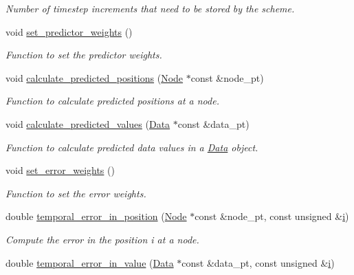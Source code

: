 \begin{DoxyCompactItemize}
\begin{DoxyCompactList}\small\item\em Number of timestep increments that need to be stored by the scheme. \end{DoxyCompactList}\item 
void \hyperlink{classoomph_1_1BDF_a9c5b309e589b0e0da14d912556e5cc4a}{set\+\_\+predictor\+\_\+weights} ()
\begin{DoxyCompactList}\small\item\em Function to set the predictor weights. \end{DoxyCompactList}\item 
void \hyperlink{classoomph_1_1BDF_a24a8bcf4fffc8cd4514ef36fc2c997f8}{calculate\+\_\+predicted\+\_\+positions} (\hyperlink{classoomph_1_1Node}{Node} $\ast$const \&node\+\_\+pt)
\begin{DoxyCompactList}\small\item\em Function to calculate predicted positions at a node. \end{DoxyCompactList}\item 
void \hyperlink{classoomph_1_1BDF_a4c3da151a405c2041103cb2795c3ff95}{calculate\+\_\+predicted\+\_\+values} (\hyperlink{classoomph_1_1Data}{Data} $\ast$const \&data\+\_\+pt)
\begin{DoxyCompactList}\small\item\em Function to calculate predicted data values in a \hyperlink{classoomph_1_1Data}{Data} object. \end{DoxyCompactList}\item 
void \hyperlink{classoomph_1_1BDF_ae7edaffc90cfe8cca6817751fa3cccb8}{set\+\_\+error\+\_\+weights} ()
\begin{DoxyCompactList}\small\item\em Function to set the error weights. \end{DoxyCompactList}\item 
double \hyperlink{classoomph_1_1BDF_ae4ef2e161fb944b7e6fcf6f7ee47579b}{temporal\+\_\+error\+\_\+in\+\_\+position} (\hyperlink{classoomph_1_1Node}{Node} $\ast$const \&node\+\_\+pt, const unsigned \&\hyperlink{cfortran_8h_adb50e893b86b3e55e751a42eab3cba82}{i})
\begin{DoxyCompactList}\small\item\em Compute the error in the position i at a node. \end{DoxyCompactList}\item 
double \hyperlink{classoomph_1_1BDF_aab34e35252db11052c72ae7692825149}{temporal\+\_\+error\+\_\+in\+\_\+value} (\hyperlink{classoomph_1_1Data}{Data} $\ast$const \&data\+\_\+pt, const unsigned \&\hyperlink{cfortran_8h_adb50e893b86b3e55e751a42eab3cba82}{i})

\end{DoxyCompactItemize}
